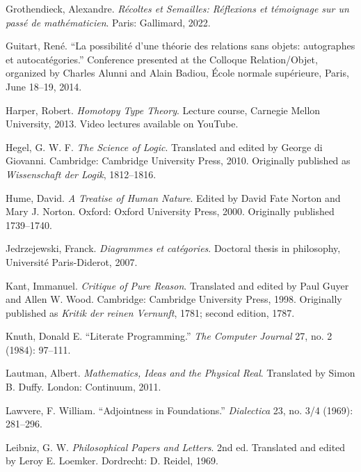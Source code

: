 \documentclass[11pt]{article}
\begin{document}
\begin{description}[leftmargin=0pt,labelwidth=0pt,itemindent=0pt,itemsep=0.55em]
\item Grothendieck, Alexandre. \emph{Récoltes et Semailles: Réflexions et
témoignage sur un passé de mathématicien}. Paris: Gallimard, 2022.

\item Guitart, René. ``La possibilité d'une théorie des relations sans objets:
autographes et autocatégories.'' Conference presented at the Colloque
Relation/Objet, organized by Charles Alunni and Alain Badiou, École normale
supérieure, Paris, June 18--19, 2014.

\item Harper, Robert. \emph{Homotopy Type Theory}. Lecture course, Carnegie
Mellon University, 2013. Video lectures available on YouTube.

\item Hegel, G. W. F. \emph{The Science of Logic}. Translated and edited by
George di Giovanni. Cambridge: Cambridge University Press, 2010. Originally
published as \emph{Wissenschaft der Logik}, 1812--1816.

\item Hume, David. \emph{A Treatise of Human Nature}. Edited by David Fate
Norton and Mary J. Norton. Oxford: Oxford University Press, 2000. Originally
published 1739--1740.

\item Jedrzejewski, Franck. \emph{Diagrammes et catégories}. Doctoral thesis in
philosophy, Université Paris-Diderot, 2007.

\item Kant, Immanuel. \emph{Critique of Pure Reason}. Translated and edited by
Paul Guyer and Allen W. Wood. Cambridge: Cambridge University Press, 1998.
Originally published as \emph{Kritik der reinen Vernunft}, 1781; second edition,
1787.

\item Knuth, Donald E. ``Literate Programming.'' \emph{The Computer Journal} 27,
no. 2 (1984): 97--111.

\item Lautman, Albert. \emph{Mathematics, Ideas and the Physical Real}.
Translated by Simon B. Duffy. London: Continuum, 2011.

\item Lawvere, F. William. ``Adjointness in Foundations.'' \emph{Dialectica} 23,
no. 3/4 (1969): 281--296.

\item Leibniz, G. W. \emph{Philosophical Papers and Letters}. 2nd ed.
Translated and edited by Leroy E. Loemker. Dordrecht: D. Reidel, 1969.


\end{description}
\end{document}

